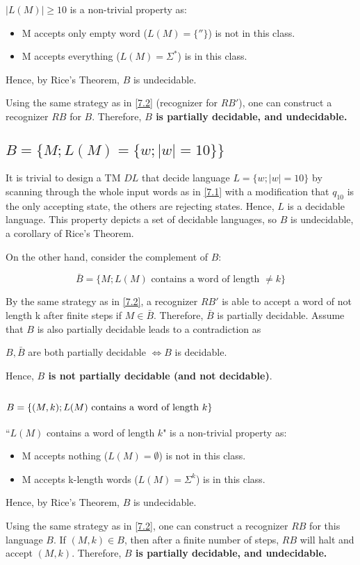 \documentclass{article}
\begin{document}
$|L(M)| \ge 10$ is a non-trivial property as:
\begin{itemize}
    \item M accepts only empty word ($L(M)=\{''\}$) is not in this class.
    \item M accepts everything ($L(M)=\Sigma^*$) is in this class.
\end{itemize}

Hence, by Rice's Theorem, $B$ is undecidable.

Using the same strategy as in \ref{7.2} (recognizer for $RB'$), one can construct a recognizer $RB$ for $B$. Therefore, \textbf{$B$ is partially decidable, and undecidable.}

\subsection{$B=\{M; L(M)=\{w; |w|=10\}\}$}
It is trivial to design a TM $DL$ that decide language $L=\{w; |w|=10\}$ by scanning through the whole input words as in \ref{7.1} with a modification that $q_{10}$ is the only accepting state, the others are rejecting states. Hence, $L$ is a decidable language. This property depicts a set of decidable languages, so $B$ is undecidable, a corollary of Rice's Theorem.

On the other hand, consider the complement of $B$:

\[\bar{B}=\{M; L(M)\text{ contains a word of length }\neq k\}\]

By the same strategy as in \ref{7.2}, a recognizer $RB'$ is able to accept a word of not length k after finite steps if $M\in \bar{B}$. Therefore, $\bar{B}$ is partially decidable. Assume that $B$ is also partially decidable leads to a contradiction as 

$B,\bar{B}$ are both partially decidable $\Leftrightarrow B$ is decidable.

Hence, \textbf{$B$ is not partially decidable (and not decidable)}.



\subsection{$B=\{(M,k); L(M) \textnormal{ contains a word of length } k\}$}

``$L(M)$ contains a word of length $k$" is a non-trivial property as:
\begin{itemize}
    \item M accepts nothing ($L(M)=\emptyset$) is not in this class.
    \item M accepts k-length words ($L(M)=\Sigma^k$) is in this class.
\end{itemize}

Hence, by Rice's Theorem, $B$ is undecidable.

Using the same strategy as in \ref{7.2}, one can construct a recognizer $RB$ for this language $B$. If $(M,k)\in B$, then after a finite number of steps, $RB$ will halt and accept $(M,k)$. Therefore, \textbf{$B$ is partially decidable, and undecidable.}
\end{document}
